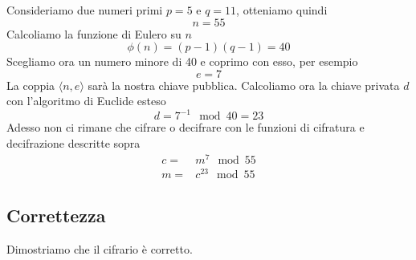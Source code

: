 \begin{example}
	Consideriamo due numeri primi $p = 5$ e $q = 11$, otteniamo quindi
	\[ n = 55 \]
	Calcoliamo la funzione di Eulero su $n$
	\[ \phi(n) = (p - 1) (q - 1) = 40 \]
	Scegliamo ora un numero minore di 40 e coprimo con esso, per esempio
	\[ e = 7 \]
	La coppia $\langle n, e \rangle$ sar\`a la nostra chiave pubblica. Calcoliamo ora la chiave privata $d$ con
	l'algoritmo di Euclide esteso
	\[ d = 7^{-1} \mod{40} = 23 \]
	Adesso non ci rimane che cifrare o decifrare con le funzioni di cifratura e decifrazione descritte sopra
	\begin{align*}
		c = & m^7 \mod{55}    \\
		m = & c^{23} \mod{55}
	\end{align*}
\end{example}

\subsection{Correttezza}
Dimostriamo che il cifrario \`e corretto.

